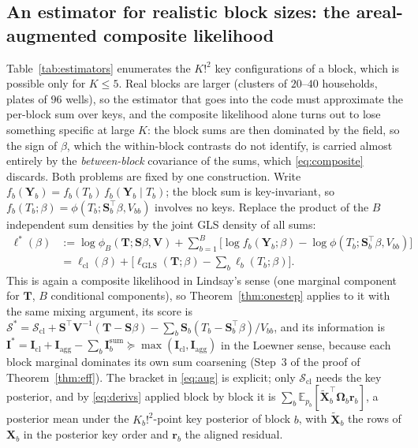 \documentclass[11pt]{article}
\theoremstyle{definition}
\newcommand{\bX}{\mathbf{X}}
\newcommand{\bY}{\mathbf{Y}}
\newcommand{\bS}{\mathbf{S}}
\newcommand{\bT}{\mathbf{T}}
\newcommand{\bV}{\mathbf{V}}
\newcommand{\bOm}{\boldsymbol{\Omega}}
\newcommand{\E}{\mathbb{E}}
\newcommand{\agg}{\mathrm{agg}}
\begin{document}
\subsection{An estimator for realistic block sizes: the areal-augmented composite likelihood}\label{sec:realistic}

Table~\ref{tab:estimators} enumerates the $K!^2$ key configurations of a block, which is possible only for $K\le5$. Real blocks are larger (clusters of $20$--$40$ households, plates of $96$ wells), so the estimator that goes into the code must approximate the per-block sum over keys, and the composite likelihood alone turns out to lose something specific at large $K$: the block sums are then dominated by the field, so the sign of $\beta$, which the within-block contrasts do not identify, is carried almost entirely by the \emph{between-block} covariance of the sums, which \eqref{eq:composite} discards. Both problems are fixed by one construction. Write $f_b(\bY_b)=f_b(T_b)\,f_b(\bY_b\mid T_b)$; the block sum is key-invariant, so $f_b(T_b;\beta)=\phi(T_b;\bS_b^\top\beta,V_{bb})$ involves no keys. Replace the product of the $B$ independent sum densities by the joint GLS density of all sums:
\begin{equation}\label{eq:aug}
\begin{aligned}
\ell^\ast(\beta)&:=\log\phi_B(\bT;\mathbf S\beta,\bV)+\sum_{b=1}^B\big[\log f_b(\bY_b;\beta)-\log\phi(T_b;\bS_b^\top\beta,V_{bb})\big]\\
&=\ell_{\mathrm{cl}}(\beta)+\Big[\ell_{\mathrm{GLS}}(\bT;\beta)-\sum_b\ell_b(T_b;\beta)\Big].
\end{aligned}
\end{equation}
This is again a composite likelihood in Lindsay's sense (one marginal component for $\bT$, $B$ conditional components), so Theorem~\ref{thm:onestep} applies to it with the same mixing argument, its score is $\bm{\mathcal S}^\ast=\bm{\mathcal S}_{\mathrm{cl}}+\mathbf S^\top\bV^{-1}(\bT-\mathbf S\beta)-\sum_b\bS_b(T_b-\bS_b^\top\beta)/V_{bb}$, and its information is $\mathbf I^\ast=\mathbf I_{\mathrm{cl}}+\mathbf I_\agg-\sum_b\mathbf I_b^{\mathrm{sum}}\succeq\max(\mathbf I_{\mathrm{cl}},\mathbf I_\agg)$ in the Loewner sense, because each block marginal dominates its own sum coarsening (Step~3 of the proof of Theorem~\ref{thm:eff}). The bracket in \eqref{eq:aug} is explicit; only $\bm{\mathcal S}_{\mathrm{cl}}$ needs the key posterior, and by \eqref{eq:derivs} applied block by block it is $\sum_b\E_{p_b}[\tilde{\bX}_b^\top\bOm_b\bm r_b]$, a posterior mean under the $K_b!^2$-point key posterior of block $b$, with $\tilde{\bX}_b$ the rows of $\bX_b$ in the posterior key order and $\bm r_b$ the aligned residual.
\end{document}

